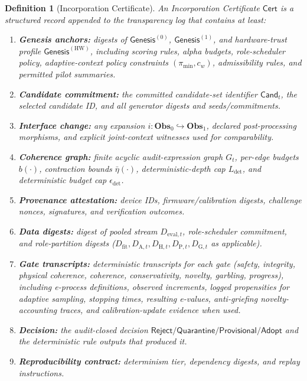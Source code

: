 \documentclass[11pt,a4paper]{article}
\newtheorem{definition}{Definition}[section]
\newcommand{\Obs}{\mathbf{Obs}}
\newcommand{\Cert}{\mathsf{Cert}}
\newcommand{\Gen}{\mathsf{Genesis}}
\newcommand{\Rej}{\mathsf{Reject}}
\newcommand{\Quar}{\mathsf{Quarantine}}
\newcommand{\Prov}{\mathsf{Provisional}}
\newcommand{\Adopt}{\mathsf{Adopt}}
\newcommand{\Cand}{\mathsf{Cand}}
\begin{document}
\begin{definition}[Incorporation Certificate]
An Incorporation Certificate $\Cert$ is a structured record appended to the transparency log that contains at least:
\begin{enumerate}[leftmargin=*]
\item \textbf{Genesis anchors:} digests of $\Gen^{(0)}$, $\Gen^{(1)}$, and hardware-trust profile $\Gen^{(\mathrm{HW})}$, including scoring rules, alpha budgets, role-scheduler policy, adaptive-context policy constraints $(\pi_{\min},c_w)$, admissibility rules, and permitted pilot summaries.
\item \textbf{Candidate commitment:} the committed candidate-set identifier $\Cand_t$, the selected candidate ID, and all generator digests and seeds/commitments.
\item \textbf{Interface change:} any expansion $i:\Obs_0\hookrightarrow\Obs_1$, declared post-processing morphisms, and explicit joint-context witnesses used for comparability.
\item \textbf{Coherence graph:} finite acyclic audit-expression graph $G_t$, per-edge budgets $b(\cdot)$, contraction bounds $\bar\eta(\cdot)$, deterministic-depth cap $L_{\det}$, and deterministic budget cap $\epsilon_{\det}$.
\item \textbf{Provenance attestation:} device IDs, firmware/calibration digests, challenge nonces, signatures, and verification outcomes.
\item \textbf{Data digests:} digest of pooled stream $D_{\mathrm{eval},t}$, role-scheduler commitment, and role-partition digests ($D_{\mathrm{fit}},D_{\mathrm{A},t},D_{\mathrm{H},t},D_{\mathrm{P},t},D_{\mathrm{G},t}$ as applicable).
\item \textbf{Gate transcripts:} deterministic transcripts for each gate (safety, integrity, physical coherence, coherence, conservativity, novelty, garbling, progress), including e-process definitions, observed increments, logged propensities for adaptive sampling, stopping times, resulting e-values, anti-griefing novelty-accounting traces, and calibration-update evidence when used.
\item \textbf{Decision:} the audit-closed decision $\Rej/\Quar/\Prov/\Adopt$ and the deterministic rule outputs that produced it.
\item \textbf{Reproducibility contract:} determinism tier, dependency digests, and replay instructions.
\end{enumerate}
\end{definition}
\end{document}
